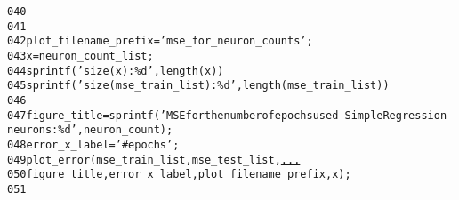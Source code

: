 \begin{alltt}
\textcolor{linenr}{040  }    
\textcolor{linenr}{041  }
\textcolor{linenr}{042  }plot\_filename\_prefix = \textcolor{string}{'mse\_for\_neuron\_counts'};
\textcolor{linenr}{043  }x = neuron\_count\_list;
\textcolor{linenr}{044  }sprintf(\textcolor{string}{'size(x): \%d'}, length(x) )
\textcolor{linenr}{045  }sprintf(\textcolor{string}{'size(mse\_train\_list): \%d'}, length(mse\_train\_list))
\textcolor{linenr}{046  }
\textcolor{linenr}{047  }figure\_title = sprintf(\textcolor{string}{'MSE for the number of epochs used - Simple Regression - neurons: \%d'}, neuron\_count);
\textcolor{linenr}{048  }error\_x\_label = \textcolor{string}{'\# epochs'};
\textcolor{linenr}{049  }plot\_error(mse\_train\_list, mse\_test\_list, \textcolor{keyword}{\underline{...}}
\textcolor{linenr}{050  }   figure\_title, error\_x\_label, plot\_filename\_prefix, x); 
\textcolor{linenr}{051  }
\end{alltt}
